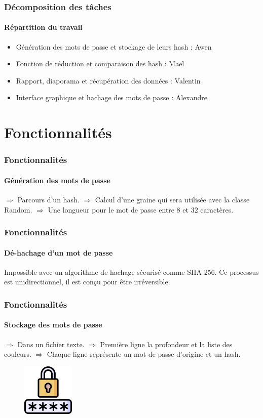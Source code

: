 \documentclass{beamer}
\begin{document}
\begin{frame}
\frametitle{Décomposition des tâches}
\framesubtitle {Répartition du travail}
\begin{block}{}
\begin{itemize}
    \item Génération des mots de passe et stockage de leurs hash : Awen
    \item Fonction de réduction et comparaison des hash : Mael
    \item Rapport, diaporama et récupération des données : Valentin
    \item Interface graphique et hachage des mots de passe : Alexandre
\end{itemize}
\end{block}
\end{frame}

\section{Fonctionnalités}

\begin{frame}
\frametitle{Fonctionnalités}
\framesubtitle {Génération des mots de passe}
\begin{block}{}
$\Rightarrow$ Parcours d'un hash.\newline
$\Rightarrow$ Calcul d'une graine qui sera utilisée avec la classe Random.\newline
$\Rightarrow$ Une longueur pour le mot de passe entre 8 et 32 caractères.
\end{block}
\end{frame}

\begin{frame}
\frametitle{Fonctionnalités}
\framesubtitle {Dé-hachage d'un mot de passe}
\begin{block}{}
Impossible avec un algorithme de hachage sécurisé comme SHA-256. Ce processus est unidirectionnel, il est conçu pour être irréversible.
\end{block}
\end{frame}

\begin{frame}
\frametitle{Fonctionnalités}
\framesubtitle {Stockage des mots de passe}
\begin{block}{}
$\Rightarrow$ Dans un fichier texte.\newline
$\Rightarrow$ Première ligne la profondeur et la liste des couleurs.\newline
$\Rightarrow$ Chaque ligne représente un mot de passe d'origine et un hash.
\end{block}
\begin{figure}[H]
\centering
\includegraphics[height=2.5cm]{img/cadenas.png}
\end{figure}
\end{frame}
\end{document}
